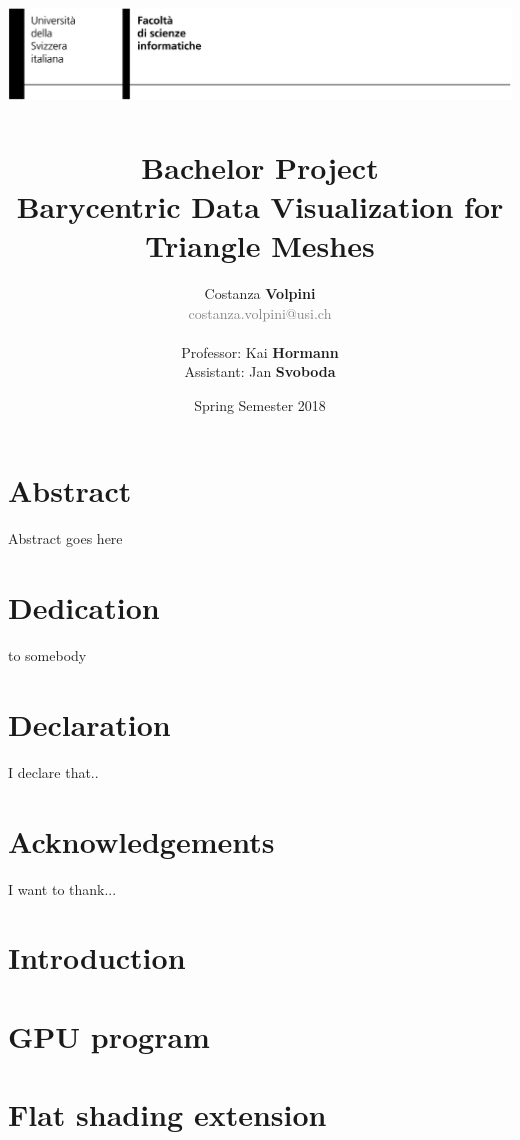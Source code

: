 \documentclass[12pt]{report}
\title{ \includegraphics[width=\linewidth]{header.png}~
\\[0.5cm]
  \huge{Bachelor Project} \\
\textbf{\Large{Barycentric Data Visualization for Triangle Meshes}}}
\date{Spring Semester 2018}
\author{Costanza \textbf{Volpini} \\ \textcolor{gray}{costanza.volpini@usi.ch} \\ \\ Professor: Kai \textbf{Hormann} \\ Assistant: Jan \textbf{Svoboda}}
\begin{document}
\pagestyle{fancy}
\maketitle
{}

\chapter*{Abstract}
Abstract goes here

\chapter*{Dedication}
to somebody

\chapter*{Declaration}
I declare that..

\chapter*{Acknowledgements}
I want to thank...

\tableofcontents
\chapter{Introduction}


\chapter{GPU program}


\chapter{Flat shading extension}


\end{document}
